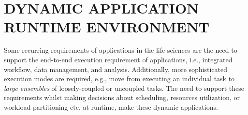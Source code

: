 \documentclass{sig-alternate}
\begin{document}



\section{DYNAMIC APPLICATION RUNTIME ENVIRONMENT}

Some recurring requirements of applications in the life sciences are
the need to support the end-to-end execution requirement of
applications, i.e., integrated workflow, data management, and
analysis.  Additionally, more sophisticated execution modes are
required, e.g., move from executing an individual task to
\textit{large ensembles} of loosely-coupled or uncoupled tasks. The need
to support these requirements whilst making decisions about
scheduling, resources utilization, or workload partitioning etc, at
runtime, make these dynamic applications.
\end{document}
